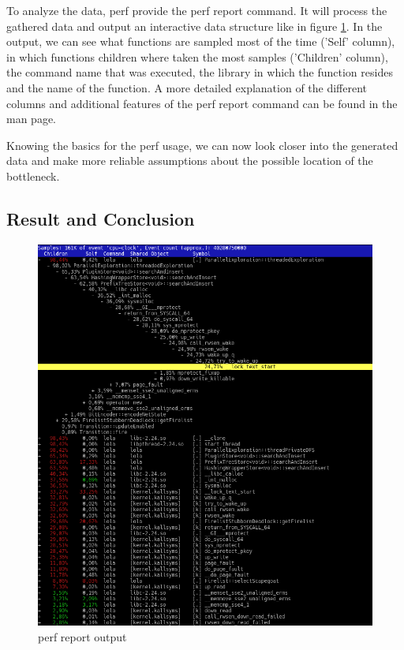 To analyze the data, perf provide the perf report command. It will process the gathered data and output an interactive data structure like in figure \ref{perf_record_sample}. In the output, we can see what functions are sampled most of the time ('Self' column), in which functions children where taken the most samples ('Children' column), the command name that was executed, the library in which the function resides and the name of the function. A more detailed explanation of the different columns and additional features of the perf report command can be found in the man page.

Knowing the basics for the perf usage, we can now look closer into the generated data and make more reliable assumptions about the possible location of the bottleneck.

\subsection{Result and Conclusion}
\label{first_perf_results}
\begin{figure}
    \centering
    \includegraphics[width=\textwidth]{pictures/perfReportSample.png}
    \caption{perf report output}
    \label{perf_record_sample}
\end{figure}
